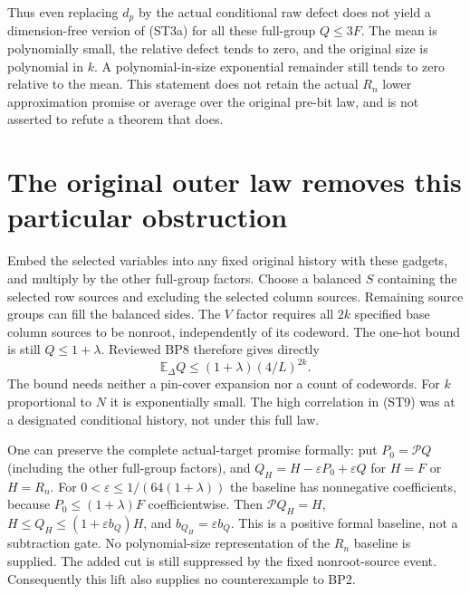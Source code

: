 \documentclass[11pt]{article}
\newcommand{\E}{\mathbb E}
\newcommand{\Pp}{\mathcal P}
\begin{document}
Thus even replacing $d_p$ by the actual conditional raw defect
does not yield a dimension-free version of (ST3a) for all these
full-group $Q\le3F$. The mean is polynomially small,
the relative defect tends to zero, and the original size is polynomial
in $k$. A polynomial-in-size exponential remainder still tends to zero
relative to the mean. This statement does not retain the actual
$R_n$ lower approximation promise or average over the original
pre-bit law, and is not asserted to refute a theorem that does.

\section{The original outer law removes this particular obstruction}
Embed the selected variables into any fixed original history with
these gadgets, and multiply by the other full-group factors.
Choose a balanced $S$ containing the selected row sources and
excluding the selected column sources. Remaining source groups can
fill the balanced sides. The $V$ factor requires all $2k$ specified
base column sources to be nonroot, independently of its codeword.
The one-hot bound is still $Q\le1+\lambda$.
Reviewed BP8 therefore gives directly
\[
       \E_\Delta Q\le(1+\lambda)(4/L)^{2k}.
\]
The bound needs neither a pin-cover expansion nor a count of codewords.
For $k$ proportional to $N$ it is exponentially small.
The high correlation in (ST9) was at a designated conditional
history, not under this full law.

One can preserve the complete actual-target promise formally:
put $P_0=\Pp Q$ (including the other full-group factors), and
$Q_H=H-\varepsilon P_0+\varepsilon Q$ for $H=F$ or $H=R_n$.
For $0<\varepsilon\le1/(64(1+\lambda))$ the baseline has nonnegative
coefficients, because $P_0\le(1+\lambda)F$ coefficientwise.
Then $\Pp Q_H=H$, $H\le Q_H\le(1+\varepsilon b_Q)H$,
and $b_{Q_H}=\varepsilon b_Q$.
This is a positive formal baseline, not a subtraction gate.
No polynomial-size representation of the $R_n$ baseline is supplied.
The added cut is still suppressed by the fixed nonroot-source event.
Consequently this lift also supplies no counterexample to BP2.
\end{document}
